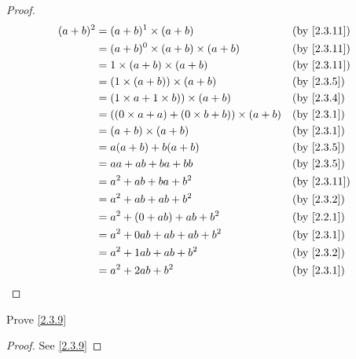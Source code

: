 \begin{proof}
  \begin{align*}
    (a + b)^2 & = (a + b)^1 \times (a + b)                             &  & \by{2.3.11} \\
              & = (a + b)^0 \times (a + b) \times (a + b)              &  & \by{2.3.11} \\
              & = 1 \times (a + b) \times (a + b)                      &  & \by{2.3.11} \\
              & = (1 \times (a + b)) \times (a + b)                    &  & \by{2.3.5}  \\
              & = (1 \times a + 1 \times b)) \times (a + b)            &  & \by{2.3.4}  \\
              & = ((0 \times a + a) + (0 \times b + b)) \times (a + b) &  & \by{2.3.1}  \\
              & = (a + b) \times (a + b)                               &  & \by{2.3.1}  \\
              & = a(a + b) + b(a + b)                                  &  & \by{2.3.5}  \\
              & = aa + ab + ba + bb                                    &  & \by{2.3.5}  \\
              & = a^2 + ab + ba + b^2                                  &  & \by{2.3.11} \\
              & = a^2 + ab + ab + b^2                                  &  & \by{2.3.2}  \\
              & = a^2 + (0 + ab) + ab + b^2                            &  & \by{2.2.1}  \\
              & = a^2 + 0ab + ab + ab + b^2                            &  & \by{2.3.1}  \\
              & = a^2 + 1ab + ab + b^2                                 &  & \by{2.3.2}  \\
              & = a^2 + 2ab + b^2                                      &  & \by{2.3.1}  \\
  \end{align*}
\end{proof}

\begin{ex}\label{ex:2.3.5}
  Prove \cref{2.3.9}
\end{ex}

\begin{proof}
  See \cref{2.3.9}
\end{proof}